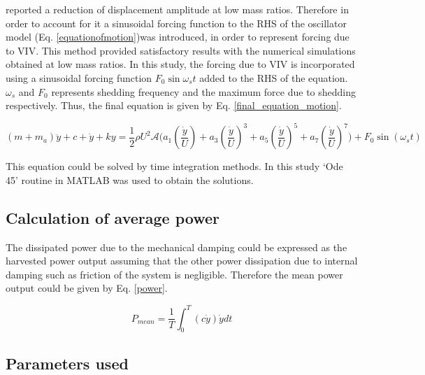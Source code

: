 \cite{Joly2012} reported a reduction of displacement amplitude at low mass ratios. Therefore in order to account for it a sinusoidal forcing function to the RHS of the oscillator model (Eq. \eqref{equationofmotion})was introduced, in order to represent forcing due to VIV. This method provided satisfactory results with the numerical simulations obtained at low mass ratios. In this study, the forcing due to VIV is incorporated using a sinusoidal forcing function $F_0\sin{\omega_{s}t}$ added to the RHS of the equation. $\omega_{s}$ and $F_0$ represents shedding frequency and the maximum force due to shedding respectively. Thus, the final equation is given by Eq. \eqref{final_equation_motion}.    

\begin{equation}
\label{final_equation_motion}
(m{+}m_a)\ddot{y}{+}c{+}\dot{y}{+}ky{=}\frac{1}{2}\rho U^2 \mathcal  {A} \Bigg(a_1\left(\frac{\dot{y}}{U}\right){+}a_3\left(\frac{\dot{y}}{U}\right)^3{+}a_5\left(\frac{\dot{y}}{U}\right)^5{+}a_7\left(\frac{\dot{y}}{U}\right)^7 \Bigg){+} F_0\sin{(\omega_s t)}
\end{equation}

This equation could be solved by time integration methods. In  this study  `Ode 45' routine in MATLAB was used to obtain the solutions.

\subsection{Calculation of average power}

 The dissipated power due to the mechanical damping could be expressed as the harvested power output assuming that the other  power dissipation due to internal damping such as friction of the system is negligible. Therefore the mean power output could be given by Eq. \eqref{power}. 
  
 
 \begin{equation}
 \label{power}
P_{mean}=\frac{1}{T}\int_{0}^{T}(c\dot{y})\dot{y} dt
 \end{equation}
 
 
 \vspace{20mm}
 
 
\subsection{Parameters used} 
 
